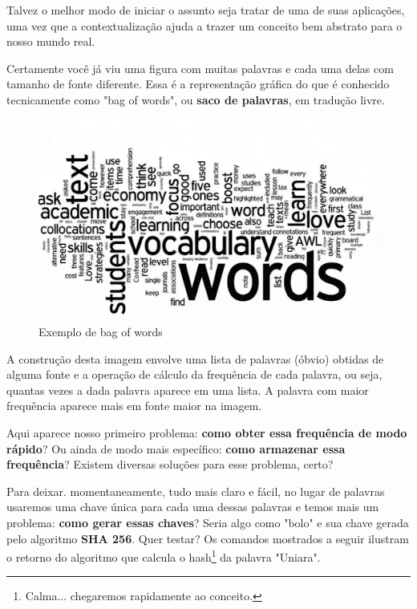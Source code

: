 Talvez o melhor modo de iniciar o assunto seja tratar de uma de suas aplicações, uma vez que a contextualização ajuda a trazer um conceito bem abstrato para o nosso mundo real.

Certamente você já viu uma figura com muitas palavras e cada uma delas com tamanho de fonte diferente. Essa é a representação gráfica do que é conhecido tecnicamente como "bag of words", ou \textbf{saco de palavras}, em tradução livre.

\begin{figure}[h]
\centering
\caption{Exemplo de bag of words}
\vspace{0.25cm}
\label{fig:bag}
\includegraphics[width=0.9\linewidth]{imagens/bag.png}
\end{figure}

A construção desta imagem envolve uma lista de palavras (óbvio) obtidas de alguma fonte e a operação de cálculo da frequência de cada palavra, ou seja, quantas vezes a dada palavra aparece em uma lista. A palavra com maior frequência aparece mais em fonte maior na imagem.

Aqui aparece nosso primeiro problema: \textbf{como obter essa frequência de modo rápido}? Ou ainda de modo mais específico: \textbf{como armazenar essa frequência}? Existem diversas soluções para esse problema, certo?

Para deixar. momentaneamente, tudo mais claro e fácil, no lugar de palavras usaremos uma chave única para cada uma dessas palavras e temos mais um problema: \textbf{como gerar essas chaves}? Seria algo como "bolo" e sua chave gerada pelo algoritmo \textbf{SHA 256}. Quer testar? Os comandos mostrados a seguir ilustram o retorno do algoritmo que calcula o hash\footnote{Calma... chegaremos rapidamente ao conceito.} da palavra "Uniara".

